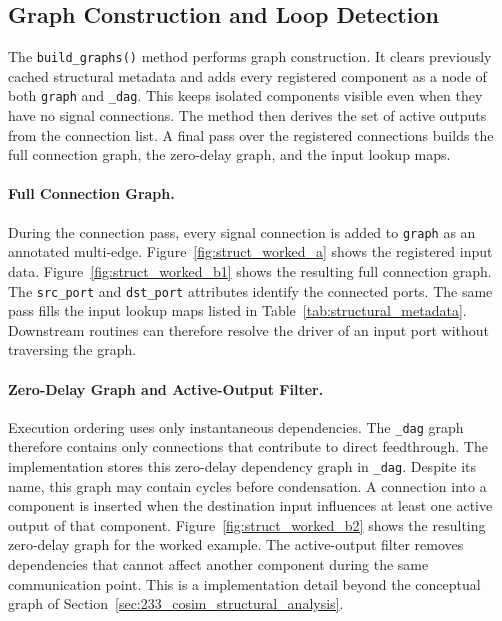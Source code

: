 \subsection{Graph Construction and Loop Detection}
\label{sec:impl_structural_graph}

The \texttt{build\_graphs()} method performs graph construction.
It clears previously cached structural metadata and adds every registered component as a node of both \texttt{graph} and \texttt{\_dag}.
This keeps isolated components visible even when they have no signal connections.
The method then derives the set of active outputs from the connection list.
A final pass over the registered connections builds the full connection graph, the zero-delay graph, and the input lookup maps.

\paragraph{Full Connection Graph.}
During the connection pass, every signal connection is added to \texttt{graph} as an annotated multi-edge.
Figure~\ref{fig:struct_worked_a} shows the registered input data.
Figure~\ref{fig:struct_worked_b1} shows the resulting full connection graph.
The \texttt{src\_port} and \texttt{dst\_port} attributes identify the connected ports.
The same pass fills the input lookup maps listed in Table~\ref{tab:structural_metadata}.
Downstream routines can therefore resolve the driver of an input port without traversing the graph.

\paragraph{Zero-Delay Graph and Active-Output Filter.}
Execution ordering uses only instantaneous dependencies.
The \texttt{\_dag} graph therefore contains only connections that contribute to direct feedthrough.
The implementation stores this zero-delay dependency graph in \texttt{\_dag}.
Despite its name, this graph may contain cycles before condensation.
A connection into a component is inserted when the destination input influences at least one active output of that component.
Figure~\ref{fig:struct_worked_b2} shows the resulting zero-delay graph for the worked example.
The active-output filter removes dependencies that cannot affect another component during the same communication point.
This is a \syssimx{} implementation detail beyond the conceptual graph of Section~\ref{sec:233_cosim_structural_analysis}.

